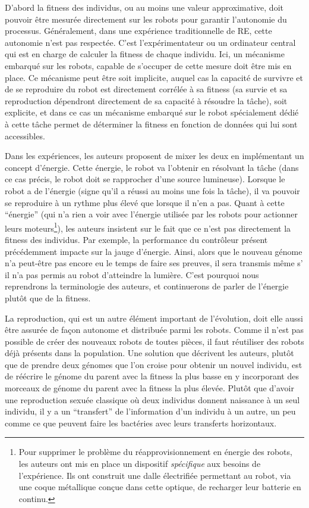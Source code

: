 D'abord la fitness des individus, ou au moins une valeur approximative, doit pouvoir être mesurée directement sur les robots pour garantir l'autonomie du processus. Généralement, dans une expérience traditionnelle de RE, cette autonomie n'est pas respectée. C'est l'expérimentateur ou un ordinateur central qui est en charge de calculer la fitness de chaque individu. Ici, un mécanisme embarqué sur les robots, capable de s'occuper de cette mesure doit être mis en place. Ce mécanisme peut être soit implicite, auquel cas la capacité de survivre et de se reproduire du robot est directement corrélée à sa fitness (sa survie et sa reproduction dépendront directement de sa capacité à résoudre la tâche), soit explicite, et dans ce cas un mécanisme embarqué sur le robot spécialement dédié à cette tâche permet de déterminer la fitness en fonction de données qui lui sont accessibles.

Dans les expériences, les auteurs proposent de mixer les deux en implémentant un concept d'énergie. Cette énergie, le robot va l'obtenir en résolvant la tâche (dans ce cas précis, le robot doit se rapprocher d'une source lumineuse). Lorsque le robot a de l'énergie (signe qu'il a réussi au moins une fois la tâche), il va pouvoir se reproduire à un rythme plus élevé que lorsque il n'en a pas. Quant à cette ``énergie'' (qui n'a rien a voir avec l'énergie utilisée par les robots pour actionner leurs moteurs\footnote{Pour supprimer le problème du réapprovisionnement en énergie des robots, les auteurs ont mis en place un dispositif \emph{spécifique} aux besoins de l'expérience. Ils ont construit une dalle électrifiée permettant au robot, via une coque métallique conçue dans cette optique, de recharger leur batterie en continu.}), les auteurs insistent sur le fait que ce n'est pas directement la fitness des individus. Par exemple, la performance du contrôleur présent précédemment  impacte sur la jauge d'énergie. Ainsi, alors que le nouveau génome n'a peut-être pas encore eu le temps de faire ses preuves, il sera transmis même s' il n'a pas permis au robot d'atteindre la lumière. C'est pourquoi nous reprendrons la terminologie des auteurs, et continuerons de parler de l'énergie plutôt que de la fitness.

La reproduction, qui est un autre élément important de l'évolution, doit elle aussi être assurée de façon autonome et distribuée parmi les robots. Comme il n'est pas possible de créer des nouveaux robots de toutes pièces, il faut réutiliser des robots déjà présents dans la population. Une solution que décrivent les auteurs, plutôt que de prendre deux génomes que l'on croise pour obtenir un nouvel individu, est de réécrire le génome du parent avec la fitness la plus basse en y incorporant des morceaux de génome du parent avec la fitness la plus élevée. Plutôt que d'avoir une reproduction sexuée classique où deux individus donnent naissance à un seul individu, il y a un ``transfert'' de l'information d'un individu à un autre, un peu comme ce que peuvent faire les bactéries avec leurs transferts horizontaux.

